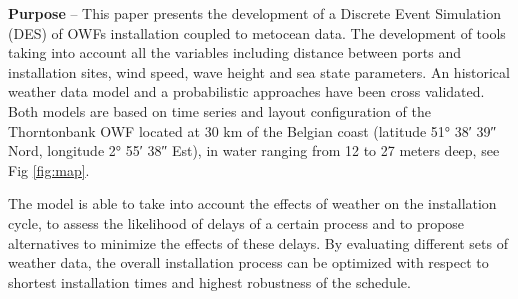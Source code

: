 \textbf{Purpose} --
This paper presents the development of a Discrete Event Simulation (DES) of OWFs installation coupled to metocean data. The development of tools taking into account all the variables including distance between ports and installation sites, wind speed, wave height and sea state parameters. An historical weather data model and a probabilistic approaches have been cross validated. Both models are based on time series and layout configuration of the Thorntonbank OWF located at 30 km of the Belgian coast (latitude 51° 38′ 39″ Nord, longitude 2° 55′ 38″ Est), in water ranging from 12 to 27 meters deep, see Fig \ref{fig:map}.

The model is able to take into account the effects of weather on the installation cycle, to assess the likelihood of delays of a certain process and to propose alternatives to minimize the effects of these delays. By evaluating different sets of weather data, the overall installation process can be optimized with respect to shortest installation times and highest robustness of the schedule.

